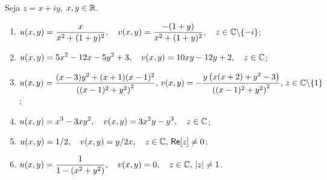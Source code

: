 
\begin{questions}

\begin{solution}
Seja $z = x+iy$, $x,y\in{\mathbb R}$.
    \begin{enumerate}[label=(\alph*)]
      \item $\displaystyle u(x,y) = \frac{x}{x^2+(1+y)^2},
        \quad \displaystyle v(x,y) = \frac{-(1+y)}{x^2+(1+y)^2},
        \quad z\in{\mathbb C}\backslash\{-i\}$;
        
      \item $\displaystyle u(x,y) = 5 x^2-12 x-5 y^2+3,
        \quad \displaystyle v(x,y) = 10 x y-12 y+2,
        \quad z\in{\mathbb C}$;
        
      \item $\displaystyle u(x,y) = \frac{(x-3) y^2+(x+1) (x-1)^2}{\left((x-1)^2+y^2\right)^2},
        \, \displaystyle v(x,y) = -\frac{y \left(x (x+2)+y^2-3\right)}{\left((x-1)^2+y^2\right)^2},
        \, z\in{\mathbb C}\backslash\{1\}$;

      \item $\displaystyle u(x,y) = x^3-3 x y^2,
        \quad \displaystyle v(x,y) = 3 x^2 y-y^3,
        \quad z\in{\mathbb C}$;

      \item $\displaystyle u(x,y) = 1/2,
        \quad \displaystyle v(x,y) = y/2x,
        \quad z\in{\mathbb C},\, \mathsf{Re}[z]\neq 0$;
        
      \item $\displaystyle u(x,y) = \frac{1}{1-(x^2+y^2)},
        \quad \displaystyle v(x,y) = 0,
        \quad z\in{\mathbb C},\, |z|\neq 1$.
    \end{enumerate}
\end{solution}


\end{questions}
